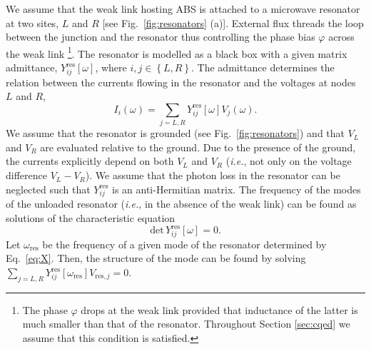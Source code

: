 \documentclass[aps,reprint,longbibliography, prb]{revtex4-2}
\begin{document}
We assume that the weak link hosting ABS is attached to a microwave resonator at two sites, $L$ and $R$ [see Fig.~\ref{fig:resonators} (a)]. External flux threads the loop between the junction and the resonator thus controlling the phase bias $\varphi$ across the weak link \footnote{The phase $\varphi$ drops at the weak link provided that inductance of the latter is much smaller than that of the resonator. Throughout Section \ref{sec:cqed} we assume that this condition is satisfied.}.
The resonator is modelled as a black box with a given matrix admittance, $Y^\mathrm{res}_{ij}[\omega]$, where $i,j \in \left\{L,R\right\}$. The admittance determines the relation between the currents flowing in the resonator and the voltages at nodes $L$ and $R$,
\begin{equation}
    I_i(\omega) = \sum_{j=L,R} Y^\mathrm{res}_{ij}[\omega] V_j(\omega).
\end{equation}
{We assume that the resonator is grounded (see Fig.~\ref{fig:resonators}) and that $V_L$ and $V_R$ are evaluated relative to the ground. Due to the presence of the ground, the currents explicitly depend on both $V_L$ and $V_R$ (\textit{i.e.}, not only on the voltage difference $V_L - V_R$).}
We assume that the photon loss in the resonator can be neglected such that $Y^\mathrm{res}_{ij}$ is an anti-Hermitian matrix. {The frequency of the modes of the unloaded resonator (\textit{i.e.}, in the absence of the weak link)} can be found as solutions of the characteristic equation
\begin{equation}
\label{eq:X}
    \mathrm{det}\,Y^\mathrm{res}_{ij}[\omega] = 0.
\end{equation}
Let $\omega_\mathrm{res}$ be the frequency of a given mode of the resonator determined by Eq.~\eqref{eq:X}. Then, the structure of the mode can be found by solving $\sum_{j=L,R}Y^\mathrm{res}_{ij}[\omega_\mathrm{res}] V_{\mathrm{res},j} = 0$.
\end{document}
